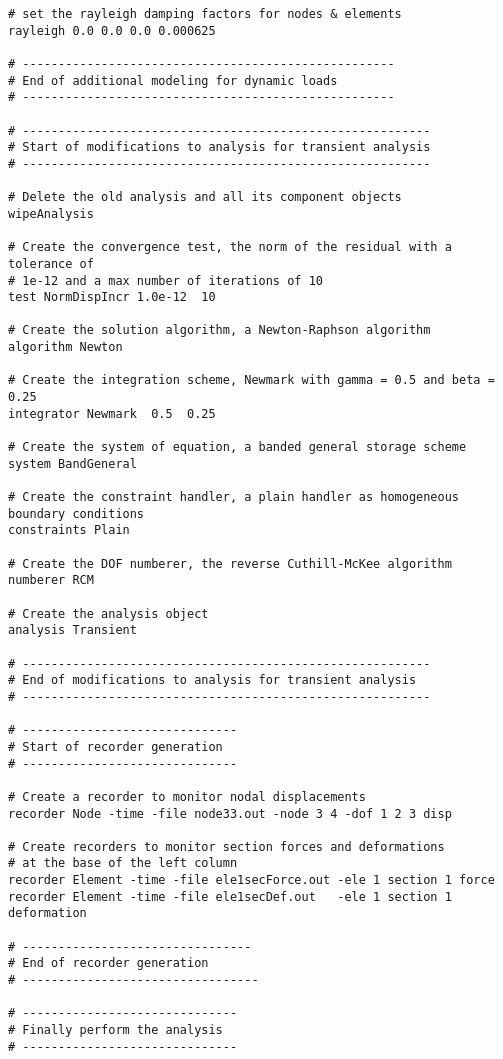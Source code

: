 \documentclass[12pt]{article}
\begin{document}
{\begin{verbatim}
# set the rayleigh damping factors for nodes & elements
rayleigh 0.0 0.0 0.0 0.000625

# ----------------------------------------------------
# End of additional modeling for dynamic loads
# ----------------------------------------------------

# ---------------------------------------------------------
# Start of modifications to analysis for transient analysis
# ---------------------------------------------------------

# Delete the old analysis and all its component objects
wipeAnalysis

# Create the convergence test, the norm of the residual with a tolerance of 
# 1e-12 and a max number of iterations of 10
test NormDispIncr 1.0e-12  10 

# Create the solution algorithm, a Newton-Raphson algorithm
algorithm Newton

# Create the integration scheme, Newmark with gamma = 0.5 and beta =  0.25
integrator Newmark  0.5  0.25 

# Create the system of equation, a banded general storage scheme
system BandGeneral

# Create the constraint handler, a plain handler as homogeneous boundary conditions
constraints Plain

# Create the DOF numberer, the reverse Cuthill-McKee algorithm
numberer RCM

# Create the analysis object
analysis Transient

# ---------------------------------------------------------
# End of modifications to analysis for transient analysis
# ---------------------------------------------------------

# ------------------------------
# Start of recorder generation
# ------------------------------

# Create a recorder to monitor nodal displacements
recorder Node -time -file node33.out -node 3 4 -dof 1 2 3 disp

# Create recorders to monitor section forces and deformations
# at the base of the left column
recorder Element -time -file ele1secForce.out -ele 1 section 1 force
recorder Element -time -file ele1secDef.out   -ele 1 section 1 deformation

# --------------------------------
# End of recorder generation
# ---------------------------------

# ------------------------------
# Finally perform the analysis
# ------------------------------


\end{verbatim}}
\end{document}
